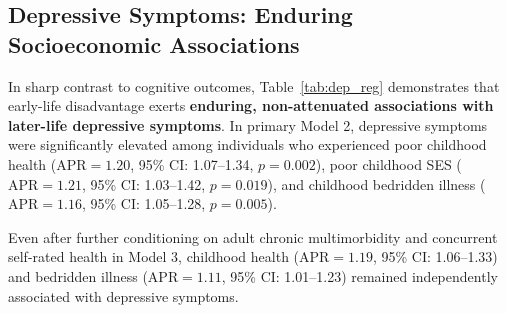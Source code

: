 \documentclass[11pt,a4paper]{article}
\begin{document}
\begin{table}[H]
\centering
\small
\caption{\textbf{Continuous Memory and Orientation Score Regressions (Linear Survey OLS, Beta Coefficients, $\mathbf{N=57,245}$).}}
\label{tab:cog_cont}
\end{table}

\subsection{Depressive Symptoms: Enduring Socioeconomic Associations}
In sharp contrast to cognitive outcomes, Table~\ref{tab:dep_reg} demonstrates that early-life disadvantage exerts \textbf{enduring, non-attenuated associations with later-life depressive symptoms}. In primary Model 2, depressive symptoms were significantly elevated among individuals who experienced poor childhood health ($\text{APR} = 1.20$, 95\% CI: 1.07--1.34, $p = 0.002$), poor childhood SES ($\text{APR} = 1.21$, 95\% CI: 1.03--1.42, $p = 0.019$), and childhood bedridden illness ($\text{APR} = 1.16$, 95\% CI: 1.05--1.28, $p = 0.005$).

Even after further conditioning on adult chronic multimorbidity and concurrent self-rated health in Model 3, childhood health ($\text{APR} = 1.19$, 95\% CI: 1.06--1.33) and bedridden illness ($\text{APR} = 1.11$, 95\% CI: 1.01--1.23) remained independently associated with depressive symptoms.
\end{document}
